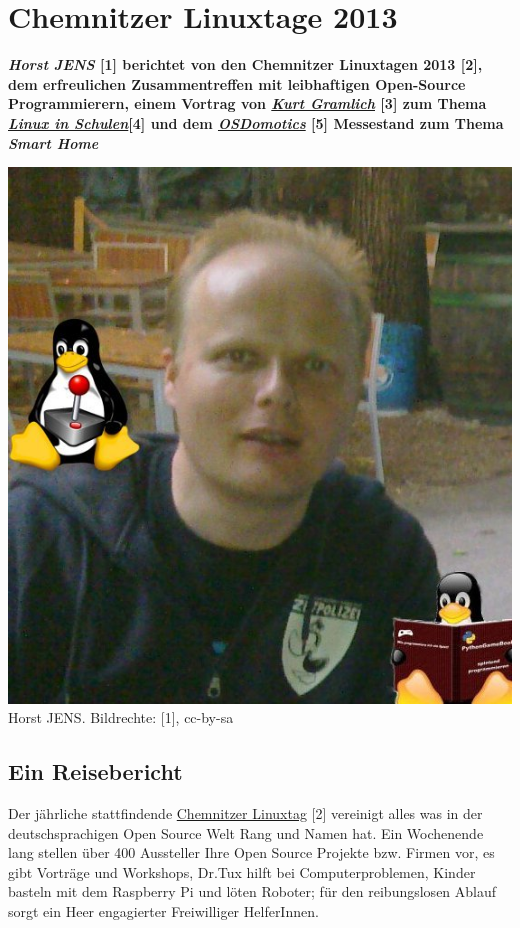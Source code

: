 \section*{Chemnitzer Linuxtage 2013}
\label{chemnitz}

\textbf{\textit{Horst JENS} [1] berichtet von den Chemnitzer Linuxtagen 2013 [2], dem erfreulichen Zusammentreffen mit leibhaftigen Open-Source Programmierern, einem Vortrag von \href{http://wiki.skolelinux.de/KurtGramlich/Biografie}{\textit{Kurt Gramlich}} [3] zum Thema \href{http://goo.gl/EoIDpy}{\textit{Linux in Schulen}}[4] und dem \href{http://osdomotics.com}{\textit{OSDomotics}} [5] Messestand zum Thema \textit{Smart Home}}
\begin{center}
\includegraphics[width=0.5\linewidth]{horst2011mitdoppeltux.jpg} \\
\footnotesize{Horst JENS. Bildrechte: [1], cc-by-sa}
\end{center}


\subsection*{Ein Reisebericht}

Der jährliche stattfindende \href{http://chemnitzer.linux-tage.de/2013/}{Chemnitzer Linuxtag} [2] vereinigt alles was in der deutschsprachigen Open Source Welt Rang und Namen hat. Ein Wochenende  lang stellen über 400 Aussteller Ihre Open Source Projekte bzw. Firmen vor, es gibt Vorträge und Workshops, Dr.Tux hilft bei Computerproblemen, Kinder basteln mit dem Raspberry Pi und löten Roboter; für den reibungslosen Ablauf sorgt ein Heer engagierter Freiwilliger HelferInnen.

